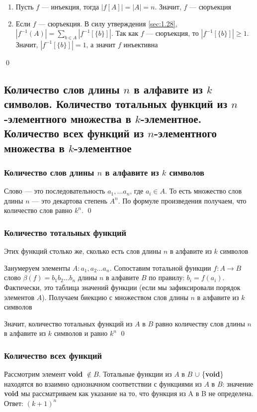 \documentclass[a4paper]{article}
\begin{document}
\proof 
\begin{enumerate}
    \item Пусть $f$ — инъекция, тогда $|f[A]|=|A|=n$. Значит, $f$ — сюръекция
    \item Если $f$ — сюръекция. В силу утверждения \ref{sec:1.28}, $|f^{-1}(A)|=\sum\limits_{b\in A} |f^{-1}[\{b\}]|.$ Так как $f$ — сюръекция, то $|f^{-1}[\{b\}]|\geqslant1$. Значит, $|f^{-1}[\{b\}]|=1$, а значит $f$ инъективна
\end{enumerate}\qed 

\subsection{Количество слов длины $n$ в алфавите из $k$ символов. Количество тотальных функций из $n$-элементного множества в $k$-элементное. Количество всех функций из $n$-элементного множества в $k$-элементное}
\subsubsection*{Количество слов длины $n$ в алфавите из $k$ символов}
Слово — это последовательность $a_1,\ldots a_n$, где $a_i\in A$. То есть множество слов длины $n$ — это декартова степень $A^n$. По формуле произведения получаем, что количество слов равно $k^n$. \qed
\subsubsection*{Количество тотальных функций}
Этих функций столько же, сколько есть слов длины $n$ в алфавите из $k$ символов

Занумеруем элементы $A: a_1,a_2\ldots a_n$. Сопоставим тотальной функции $f: A\rightarrow B$ слово $\beta(f)=b_1b_2\ldots b_n$ длины $n$ в алфавите $B$ по правилу: $b_i=f(a_i)$. Фактически, это таблица значений функции (если мы зафиксировали порядок элементов $A$). Получаем биекцию с множеством слов длины $n$ в алфавите из $k$ символов

Значит, количество тотальных функций из $A$ в $B$ равно количеству слов длины $n$ в алфавите из $k$ символов и равно $k^n$ \qed

\subsubsection*{Количество всех функций}
Рассмотрим элемент \textbf{void} $\notin B$. Тотальные функции из $A$ в $B$ $\cup$ \{\textbf{void}\} находятся во взаимно однозначном соответствии с функциями из $A$ в $B$: значение \textbf{void} мы рассматриваем как указание на то, что функция из A в B не определена. Ответ: $(k+1)^n$
\end{document}
